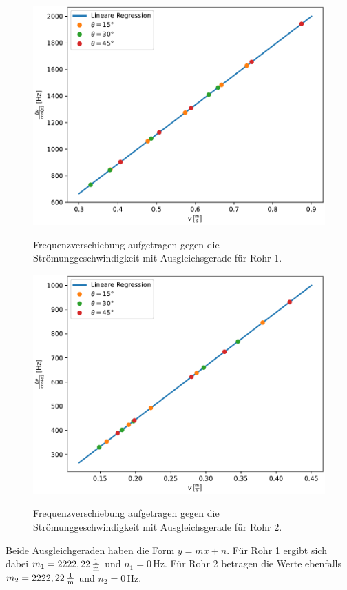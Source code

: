 \begin{figure}[H]
   \centering
   \caption{Frequenzverschiebung aufgetragen gegen die Strömunggeschwindigkeit mit Ausgleichsgerade für Rohr 1.}
   \includegraphics[width=0.8\linewidth]{plot1.pdf}
   \label{fig:Abschnitt1_10mm}
\end{figure}

\begin{figure}[H]
    \centering
    \caption{Frequenzverschiebung aufgetragen gegen die Strömunggeschwindigkeit mit Ausgleichsgerade für Rohr 2.}
    \includegraphics[width=0.8\linewidth]{plot2.pdf}
    \label{fig:Abschnitt1_16mm}
\end{figure}
Beide Ausgleichgeraden haben die Form $y = mx + n$. Für Rohr 1 ergibt sich dabei $m_1 = 2222,22 \, \unit[per-mode=fraction]{\per\meter}$ und $n_1 = 0 \, \unit{\hertz}$. Für Rohr 2 betragen die Werte 
ebenfalls  $m_2 = 2222,22 \, \unit[per-mode=fraction]{\per\meter}$ und $n_2 = 0 \, \unit{\hertz}$. 

